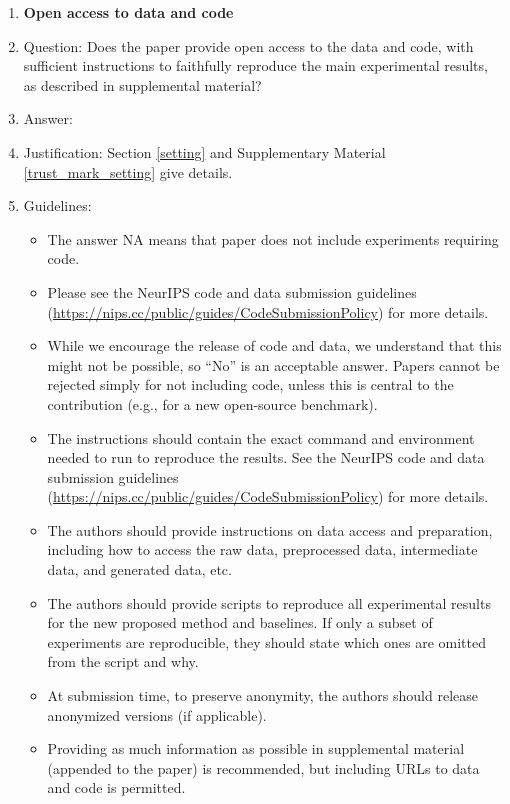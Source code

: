 \documentclass{article}
\begin{document}
\begin{enumerate}
\item {\bf Open access to data and code}
    \item[] Question: Does the paper provide open access to the data and code, with sufficient instructions to faithfully reproduce the main experimental results, as described in supplemental material?
    \item[] Answer: \answerYes{} %
    \item[] Justification: Section \ref{setting} and Supplementary Material \ref{trust_mark_setting}  give details.
    \item[] Guidelines:
    \begin{itemize}
        \item The answer NA means that paper does not include experiments requiring code.
        \item Please see the NeurIPS code and data submission guidelines (\url{https://nips.cc/public/guides/CodeSubmissionPolicy}) for more details.
        \item While we encourage the release of code and data, we understand that this might not be possible, so “No” is an acceptable answer. Papers cannot be rejected simply for not including code, unless this is central to the contribution (e.g., for a new open-source benchmark).
        \item The instructions should contain the exact command and environment needed to run to reproduce the results. See the NeurIPS code and data submission guidelines (\url{https://nips.cc/public/guides/CodeSubmissionPolicy}) for more details.
        \item The authors should provide instructions on data access and preparation, including how to access the raw data, preprocessed data, intermediate data, and generated data, etc.
        \item The authors should provide scripts to reproduce all experimental results for the new proposed method and baselines. If only a subset of experiments are reproducible, they should state which ones are omitted from the script and why.
        \item At submission time, to preserve anonymity, the authors should release anonymized versions (if applicable).
        \item Providing as much information as possible in supplemental material (appended to the paper) is recommended, but including URLs to data and code is permitted.
    \end{itemize}



\end{enumerate}
\end{document}
